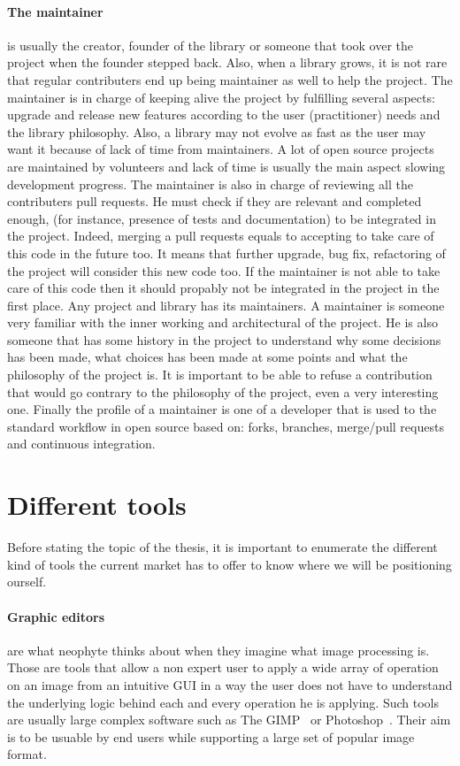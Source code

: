 \paragraph{The maintainer} is usually the creator, founder of the library or someone that took over the project when the
founder stepped back. Also, when a library grows, it is not rare that regular contributers end up being maintainer as
well to help the project. The maintainer is in charge of keeping alive the project by fulfilling several aspects:
upgrade and release new features according to the user (practitioner) needs and the library philosophy. Also, a library
may not evolve as fast as the user may want it because of lack of time from maintainers. A lot of open source projects
are maintained by volunteers and lack of time is usually the main aspect slowing development progress. The maintainer is
also in charge of reviewing all the contributers pull requests. He must check if they are relevant and completed enough,
(for instance, presence of tests and documentation) to be integrated in the project. Indeed, merging a pull requests
equals to accepting to take care of this code in the future too. It means that further upgrade, bug fix, refactoring of
the project will consider this new code too. If the maintainer is not able to take care of this code then it should
propably not be integrated in the project in the first place. Any project and library has its maintainers. A maintainer
is someone very familiar with the inner working and architectural of the project. He is also someone that has some
history in the project to understand why some decisions has been made, what choices has been made at some points and
what the philosophy of the project is. It is important to be able to refuse a contribution that would go contrary to the
philosophy of the project, even a very interesting one. Finally the profile of a maintainer is one of a developer that
is used to the standard workflow in open source based on: forks, branches, merge/pull requests and continuous
integration.

\section*{Different tools}

Before stating the topic of the thesis, it is important to enumerate the different kind of tools the current market has
to offer to know where we will be positioning ourself.

\paragraph{Graphic editors} are what neophyte thinks about when they imagine what image processing is. Those are tools
that allow a non expert user to apply a wide array of operation on an image from an intuitive GUI in a way the user does
not have to understand the underlying logic behind each and every operation he is applying. Such tools are usually large
complex software such as The GIMP~\parencite{gimp.2019} or Photoshop~\parencite{adobe.2019.photoshop}. Their aim is to
be usuable by end users while supporting a large set of popular image format.

